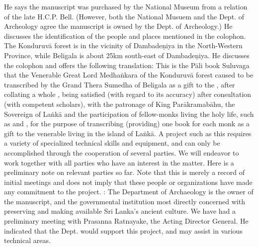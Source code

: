 \markdownRendererUlItem He says the manuscript was purchased by the National Museum from a relation of the late H.C.P. Bell. (However, both the National Musuem and the Dept. of Archeology agree the manuscript is owned by the Dept. of Archeology.)\markdownRendererUlItemEnd 
\markdownRendererUlItem He discusses the identification of the people and places mentioned in the colophon. The Konduruvā forest is in the vicinity of Dambadeṇiya in the North-Western Province, while Beligala is about 25km south-east of Dambadeṇiya.\markdownRendererUlItemEnd 
\markdownRendererUlEndTight \markdownRendererInterblockSeparator
{}He discusses the colophon and offers the following translation:\markdownRendererInterblockSeparator
{}\markdownRendererBlockQuoteBegin
This is the Pāli book Suluvaga that the Venerable Great Lord Medhaṅkara of the Konduruvā forest caused to be transcribed by the Grand Thera Sumedha of Beligala as a gift to the , after collating a whole , being satisfied (with regard to its accuracy) after consultation (with competent scholars), with the patronage of King Parākramabāhu, the Sovereign of Laṅkā and the participation of fellow-monks living the holy life, such as  and , for the purpose of transcribing (providing) one book for each monk as a gift to the venerable  living in the island of Laṅkā.
\markdownRendererBlockQuoteEnd \markdownRendererInterblockSeparator
{}\markdownRendererInterblockSeparator
{}A project such as this requires a variety of specialized technical skills and equipment, and can only be accomplished through the cooperation of several parties. We will endeavor to work together with all parties who have an interest in the matter. Here is a preliminary note on relevant parties so far. Note that this is merely a record of initial meetings and does not imply that these people or organizations have made any commitment to the project.\markdownRendererInterblockSeparator
{}\markdownRendererOlBegin
{}: The Department of Archaeology is the owner of the manuscript, and the governmental institution most directly concerned with preserving and making available Sri Lanka’s ancient culture. We have had a preliminary meeting with Prasanna Ratnayake, the Acting Director General. He indicated that the Dept. would support this project, and may assist in various technical areas.\markdownRendererOlItemEnd 

